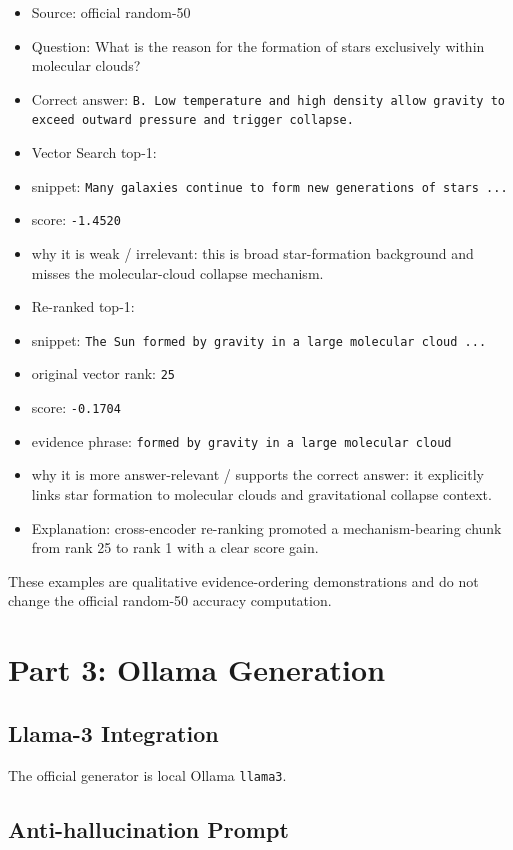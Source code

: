 \documentclass[12pt,a4paper]{article}
\begin{document}
\begin{itemize}
    \item Source: official random-50
    \item Question: What is the reason for the formation of stars exclusively within molecular clouds?
    \item Correct answer: \texttt{B. Low temperature and high density allow gravity to exceed outward pressure and trigger collapse.}
    \item Vector Search top-1:
    \item snippet: \texttt{Many galaxies continue to form new generations of stars ...}
    \item score: \texttt{-1.4520}
    \item why it is weak / irrelevant: this is broad star-formation background and misses the molecular-cloud collapse mechanism.
    \item Re-ranked top-1:
    \item snippet: \texttt{The Sun formed by gravity in a large molecular cloud ...}
    \item original vector rank: \texttt{25}
    \item score: \texttt{-0.1704}
    \item evidence phrase: \texttt{formed by gravity in a large molecular cloud}
    \item why it is more answer-relevant / supports the correct answer: it explicitly links star formation to molecular clouds and gravitational collapse context.
    \item Explanation: cross-encoder re-ranking promoted a mechanism-bearing chunk from rank 25 to rank 1 with a clear score gain.
\end{itemize}

These examples are qualitative evidence-ordering demonstrations and do not change the official random-50 accuracy computation.
\section{Part 3: Ollama Generation}

\subsection{Llama-3 Integration}

The official generator is local Ollama \texttt{llama3}.

\subsection{Anti-hallucination Prompt}
\end{document}
